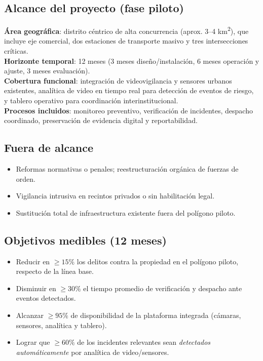 \documentclass[12pt,a4paper]{article}
\begin{document}
\subsection*{Alcance del proyecto (fase piloto)}
\textbf{Área geográfica}: distrito céntrico de alta concurrencia (aprox. 3--4 km\textsuperscript{2}), que incluye eje comercial, dos estaciones de transporte masivo y tres intersecciones críticas.\\
\textbf{Horizonte temporal}: 12 meses (3 meses diseño/instalación, 6 meses operación y ajuste, 3 meses evaluación).\\
\textbf{Cobertura funcional}: integración de videovigilancia y sensores urbanos existentes, analítica de video en tiempo real para detección de eventos de riesgo, y tablero operativo para coordinación interinstitucional.\\
\textbf{Procesos incluidos}: monitoreo preventivo, verificación de incidentes, despacho coordinado, preservación de evidencia digital y reportabilidad.

\subsection*{Fuera de alcance}
\begin{itemize}
    \item Reformas normativas o penales; reestructuración orgánica de fuerzas de orden.
    \item Vigilancia intrusiva en recintos privados o sin habilitación legal.
    \item Sustitución total de infraestructura existente fuera del polígono piloto.
\end{itemize}

\subsection*{Objetivos medibles (12 meses)}
\begin{itemize}
    \item Reducir en \(\geq 15\%\) los delitos contra la propiedad en el polígono piloto, respecto de la línea base.
    \item Disminuir en \(\geq 30\%\) el tiempo promedio de verificación y despacho ante eventos detectados.
    \item Alcanzar \(\geq 95\%\) de disponibilidad de la plataforma integrada (cámaras, sensores, analítica y tablero).
    \item Lograr que \(\geq 60\%\) de los incidentes relevantes sean \textit{detectados automáticamente} por analítica de video/sensores.
\end{itemize}
\end{document}
